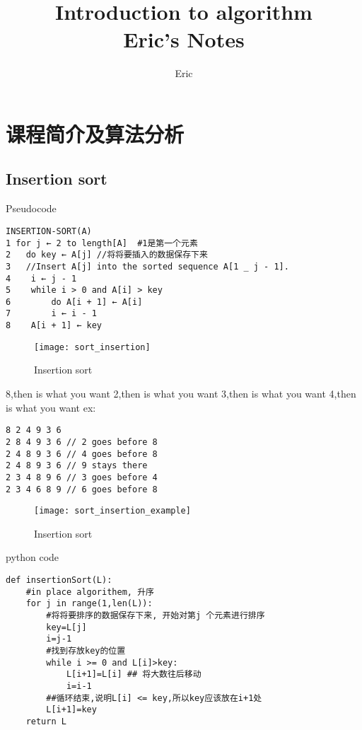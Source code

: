 \documentclass{article}
\begin{document}
\title{Introduction to algorithm \\Eric's Notes}
\author{Eric}
\maketitle
\newpage
\tableofcontents
\newpage

\section{课程简介及算法分析}
\subsection{Insertion sort}
Pseudocode
\begin{verbatim}
INSERTION-SORT(A)
1 for j ← 2 to length[A]  #1是第一个元素
2 	do key ← A[j] //将将要插入的数据保存下来
3 	//Insert A[j] into the sorted sequence A[1 _ j - 1].
4	 i ← j - 1
5	 while i > 0 and A[i] > key
6		 do A[i + 1] ← A[i]
7		 i ← i - 1
8	 A[i + 1] ← key
\end{verbatim}
\begin{figure}[htbp]
  \centering
  \texttt{[image: sort\_insertion]}\\
  \caption{Insertion sort}\label{fig.sort.insertion}
\end{figure}
8,then is what you want
2,then is what you want
3,then is what you want
4,then is what you want
ex:
\begin{verbatim}
8 2 4 9 3 6
2 8 4 9 3 6 // 2 goes before 8
2 4 8 9 3 6 // 4 goes before 8
2 4 8 9 3 6 // 9 stays there
2 3 4 8 9 6 // 3 goes before 4
2 3 4 6 8 9 // 6 goes before 8
\end{verbatim}

\begin{figure}[htbp]
  \centering
  \texttt{[image: sort\_insertion\_example]}\\
  \caption{Insertion sort}\label{fig.sort.insertion.example}
\end{figure}

python code
\begin{verbatim}
def insertionSort(L):
	#in place algorithem, 升序
	for j in range(1,len(L)):
		#将将要排序的数据保存下来, 开始对第j 个元素进行排序
		key=L[j]
		i=j-1
		#找到存放key的位置
		while i >= 0 and L[i]>key:
			L[i+1]=L[i] ## 将大数往后移动
			i=i-1
		##循环结束,说明L[i] <= key,所以key应该放在i+1处
		L[i+1]=key
	return L
\end{verbatim}
\end{document}
